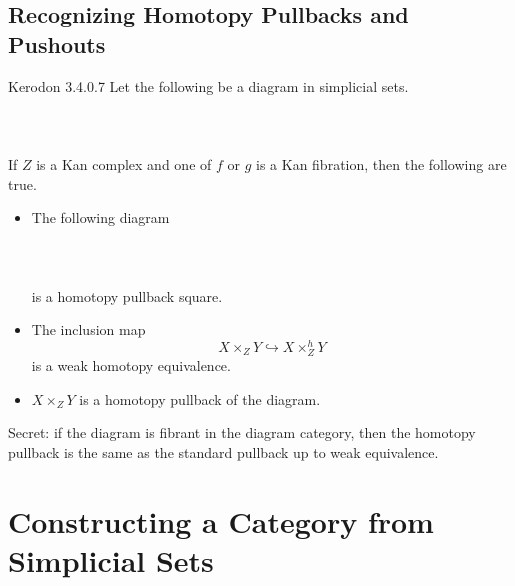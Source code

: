 \documentclass[a4paper]{article}
\begin{document}
\subsection{Recognizing Homotopy Pullbacks and Pushouts}
\begin{prp}{Kerodon 3.4.0.7}{} Let the following be a diagram in simplicial sets. \\~\\
\\~\\
If $Z$ is a Kan complex and one of $f$ or $g$ is a Kan fibration, then the following are true. 
\begin{itemize}
\item The following diagram \\~\\
\\~\\
is a homotopy pullback square. 
\item The inclusion map $$X\times_ZY\hookrightarrow X\times_Z^hY$$ is a weak homotopy equivalence. 
\item $X\times_ZY$ is a homotopy pullback of the diagram. 
\end{itemize}
\end{prp}

Secret: if the diagram is fibrant in the diagram category, then the homotopy pullback is the same as the standard pullback up to weak equivalence. 

\pagebreak
\section{Constructing a Category from Simplicial Sets}
\end{document}
